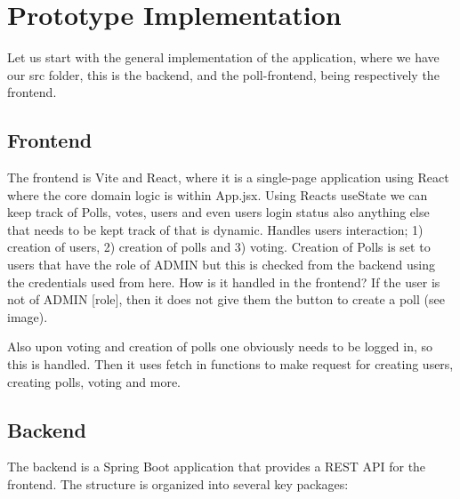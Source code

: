 \section{Prototype Implementation}
\label{sec:implementation}
Let us start with the general implementation of the application, where we have our src folder, this is the backend, and the poll-frontend, being respectively the frontend.

\subsection{Frontend}
The frontend is Vite and React, where it is a single-page application using React where the core domain logic is within App.jsx.
Using Reacts useState  we can keep track of Polls, votes, users and even users login status also anything else that needs to be kept track of that is dynamic.
Handles users interaction; 1) creation of users, 2) creation of polls and 3) voting. Creation of Polls is set to users that have the role of ADMIN but this is checked from the backend using the credentials used from here. How is it handled in the frontend? If the user is not of ADMIN [role], then it does not give them the button to create a poll (see image).


Also upon voting and creation of polls one obviously needs to be logged in, so this is handled.
Then it uses fetch in functions to make request for creating users, creating polls, voting and more.

\subsection{Backend}

The backend is a Spring Boot application that provides a REST API for the frontend. The structure is organized into several key packages:

